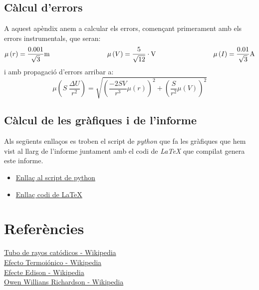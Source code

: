 \documentclass[11pt]{article}
\begin{document}
    \subsection{Càlcul d'errors}\label{appendix:error}
        A aquest apèndix anem a calcular els errors, començant primerament amb els errors instrumentals, que seran: \[\mu\left(r\right)=\frac{0.001}{\sqrt{3}}\si{\meter} \hspace{30mm} \mu\left(V\right)=\frac{5}{\sqrt{12}}\cdot \si{\volt}\hspace{30mm}\mu\left(I\right)=\frac{0.01}{\sqrt{3}}\si{\ampere}\] i amb propagació d'errors arribar a:\[\mu\left(S\ \frac{\Delta U}{r^2}\right)=\sqrt{\left(\frac{-2SV}{r^3}\mu\left(r\right)\right)^2+ \left(\frac{S}{r^2}\mu\left(V\right)\right)^2}\]
    \subsection{Càlcul de les gràfiques i de l'informe}\label{appendix:gràfiques}
        Als següents enllaços es troben el script de \textit{python} que fa les gràfiques que hem vist al llarg de l'informe juntament amb el codi de \textit{LaTeX} que compilat genera este informe.
        \begin{itemize}
            \item \href{https://github.com/vmr48-ua/extras/blob/main/TEC1-MyO1.py}{Enllaç al script de python}
            \item \href{https://www.overleaf.com/read/wfcwdqyrqfct}{Enllaç codi de LaTeX}
        \end{itemize}
        
    \clearpage
\section{Referències}
    \href{https://es.wikipedia.org/wiki/Tubo_de_rayos_cat%C3%B3dicos}{Tubo de rayos catódicos - Wikipedia}\\
    
    \href{https://es.wikipedia.org/wiki/Emisi%C3%B3n_termoi%C3%B3nica}{Efecto Termoiónico - Wikipedia}\\
    
    \href{https://ca.wikipedia.org/wiki/Efecte_Edison}{Efecte Edison - Wikipedia}\\
    
    \href{https://es.wikipedia.org/wiki/Owen_Willans_Richardson}{Owen Willians Richardson - Wikipedia}\\
    
\end{document}
